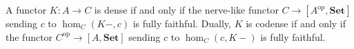 A functor $K: A \to C$ is dense if and only if the nerve-like functor $C \to [A^{\mathrm{op}}, \mathbf{Set}]$ sending $c$ to $\hom_C(K-, c)$ is fully faithful. Dually, $K$ is codense if and only if the functor $C^{\mathrm{op}} \to [A, \mathbf{Set}]$ sending $c$ to $\hom_C(c, K-)$ is fully faithful.
